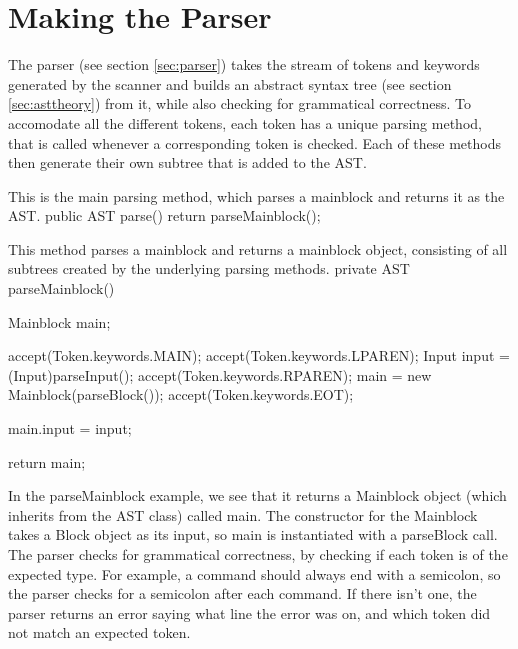 \section{Making the Parser}
The parser (see section \ref{sec:parser}) takes the stream of tokens and keywords generated by the scanner and builds an abstract syntax tree (see section \ref{sec:asttheory}) from it, while also checking for grammatical correctness.
To accomodate all the different tokens, each token has a unique parsing method, that is called whenever a corresponding token is checked.
Each of these methods then generate their own subtree that is added to the AST. \\

\begin{source}{This is the main parsing method, which parses a mainblock and returns it as the AST.}{}
public AST parse()
        {
            return parseMainblock();
        }
\end{source}
\begin{source}{This method parses a mainblock and returns a mainblock object, consisting of all subtrees created by the underlying parsing methods.}{}
private AST parseMainblock()
        {
            Mainblock main;

            accept(Token.keywords.MAIN);
            accept(Token.keywords.LPAREN);
            Input input = (Input)parseInput();
            accept(Token.keywords.RPAREN);
            main = new Mainblock(parseBlock());
            accept(Token.keywords.EOT);

            main.input = input;

            return main;
        }
\end{source}
In the parseMainblock example, we see that it returns a Mainblock object (which inherits from the AST class) called main. 
The constructor for the Mainblock takes a Block object as its input, so main is instantiated with a parseBlock call. \\
The parser checks for grammatical correctness, by checking if each token is of the expected type. 
For example, a command should always end with a semicolon, so the parser checks for a semicolon after each command. 
If there isn't one, the parser returns an error saying what line the error was on, and which token did not match an expected token.